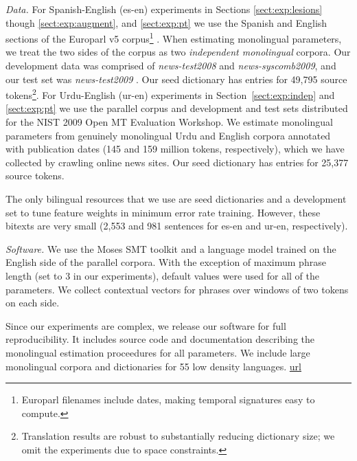 \documentclass[11pt]{article}
\newcommand{\secref}[1]{Section~\ref{#1}}
\newcommand{\figref}[1]{Figure~\ref{#1}}
\newcommand{\paraheader}[1]{\vskip 0.05in \noindent\emph{#1}}
\begin{document}
\paraheader{Data.} For Spanish-English (es-en) experiments in Sections \ref{sect:exp:lesions} though \ref{sect:exp:augment}, and \ref{sect:exp:pt} we use the Spanish and English sections of the Europarl v5 corpus\footnote{Europarl filenames include dates, making temporal signatures easy to compute.} \cite{Koehn:2005}. When estimating monolingual parameters, we treat the two sides of the corpus as two {\em independent monolingual} corpora.  Our development data was comprised of {\em news-test2008} and {\em news-syscomb2009}, and our test set was {\em news-test2009} \cite{callisonburch-EtAl:2010:WMT}.  Our seed dictionary has entries for 49,795 source tokens\footnote{Translation results are robust to substantially reducing dictionary size; we omit the experiments due to space constraints.}.
For Urdu-English (ur-en) experiments in \secref{sect:exp:indep} and  \ref{sect:exp:pt} we use the parallel corpus and development and test sets distributed for the NIST 2009 Open MT Evaluation Workshop.  We estimate monolingual parameters from genuinely monolingual Urdu and English corpora annotated with publication dates (145 and 159 million tokens, respectively), which we have collected by crawling online news sites.  %
Our seed dictionary has entries for 25,377 source tokens.

The only bilingual resources that we use are seed dictionaries and a development set to tune feature weights in minimum error rate training.  However, these bitexts are very small (2,553 and 981 sentences for es-en and ur-en, respectively).  

\paraheader{Software.} We use the Moses SMT toolkit \cite{Moses} and a language model trained on the English side of the parallel corpora.  With the exception of maximum phrase length (set to 3 in our experiments), default values were used for all of the parameters.  We collect contextual vectors for phrases over windows of two tokens on each side. %

Since our experiments are complex, we release our software for full reproducibility.  It includes source code and documentation describing the monolingual estimation proceedures for all parameters. We include large monolingual corpora and dictionaries for 55 low density languages. \url{url}
\end{document}
